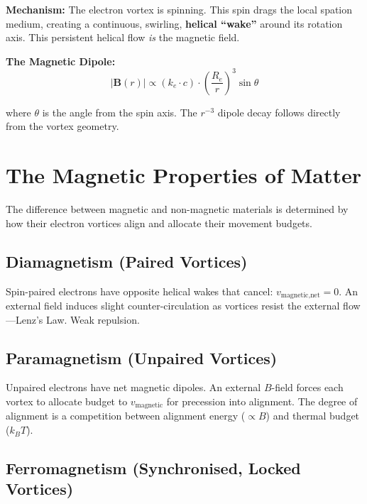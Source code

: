 \textbf{Mechanism:} The electron vortex is spinning.  This spin drags the local spation medium, creating a continuous, swirling, \textbf{helical ``wake''} around its rotation axis.  This persistent helical flow \emph{is} the magnetic field.

\textbf{The Magnetic Dipole:}
\begin{equation}\label{eq:B-dipole}
  |\mathbf{B}(r)| \propto (k_e \cdot c) \cdot \left(\frac{R_e}{r}\right)^3 \sin\theta
\end{equation}

where $\theta$ is the angle from the spin axis.  The $r^{-3}$ dipole decay follows directly from the vortex geometry.


\section{The Magnetic Properties of Matter}

The difference between magnetic and non-magnetic materials is determined by how their electron vortices align and allocate their movement budgets.

\subsection{Diamagnetism (Paired Vortices)}

Spin-paired electrons have opposite helical wakes that cancel: $v_{\text{magnetic,net}} = 0$.  An external field induces slight counter-circulation as vortices resist the external flow---Lenz's Law.  Weak repulsion.

\subsection{Paramagnetism (Unpaired Vortices)}

Unpaired electrons have net magnetic dipoles.  An external $B$-field forces each vortex to allocate budget to $v_{\text{magnetic}}$ for precession into alignment.  The degree of alignment is a competition between alignment energy ($\propto B$) and thermal budget ($k_B T$).

\subsection{Ferromagnetism (Synchronised, Locked Vortices)}

